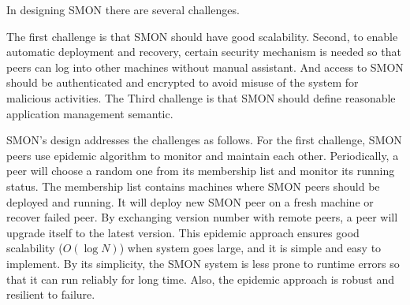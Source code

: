 


In designing SMON there are several challenges.

The first challenge is that SMON should have good
scalability. Second, to enable automatic deployment and
recovery, certain security mechanism is needed so that peers
can log into other machines without manual assistant. And
access to SMON should be authenticated and encrypted to
avoid misuse of the system for malicious activities. The
Third challenge is that SMON should define reasonable
application management semantic.

SMON's design addresses the challenges as follows. For the
first challenge, SMON peers use epidemic algorithm to
monitor and maintain each other. Periodically, a peer will
choose a random one from its membership list and monitor its
running status. The membership list contains machines where
SMON peers should be deployed and running. It will deploy
new SMON peer on a fresh machine or recover failed peer. 
By exchanging version number with remote peers, a peer will
upgrade itself to the latest version.  This epidemic
approach ensures good scalability ($O(\log N)$) when system
goes large, and it is simple and easy to implement. By its
simplicity, the SMON system is less prone to runtime errors
so that it can run reliably for long time. Also, the
epidemic approach is robust and resilient to failure.

